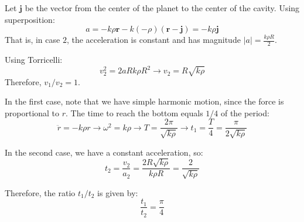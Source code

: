 \documentclass[11pt]{article}
\begin{document}
\begin{pproblem}
\begin{pssolution*}{}{}
\begin{alternativas}
            Let \(\mathbf{j}\) be the vector from the center of the planet to the center of the cavity. Using superposition:
            \[a = -k\rho\mathbf{r} - k(-\rho)(\mathbf{r}-\mathbf{j}) = -k\rho\mathbf{j}\]
            That is, in case \(2\), the acceleration is constant and has magnitude \(|a| = \frac{k\rho R}{2}\).
            
            Using Torricelli:
            \[v_2^2 = 2aR k\rho R^2 \rightarrow \boxed{v_2 = R\sqrt{k\rho}}\]
            Therefore, \(v_1/v_2 = 1\).

            \item In the first case, note that we have simple harmonic motion, since the force is proportional to \(r\). The time to reach the bottom equals \(1/4\) of the period:
            \[\ddot{r} = -k\rho r \rightarrow \omega^2 = k\rho \rightarrow T = \frac{2\pi}{\sqrt{k\rho}} \rightarrow t_1 = \frac{T}{4} = \frac{\pi}{2\sqrt{k\rho}}\]

            In the second case, we have a constant acceleration, so:
            \[t_2 = \frac{v_2}{a_2} = \frac{2R\sqrt{k\rho}}{k\rho R} = \frac{2}{\sqrt{k\rho}}\]

            Therefore, the ratio \(t_1/t_2\) is given by:
            \[\boxed{\frac{t_1}{t_2} = \frac{\pi}{4}}\]

        \end{alternativas}
    \end{pssolution*}
\end{pproblem}
\end{document}
